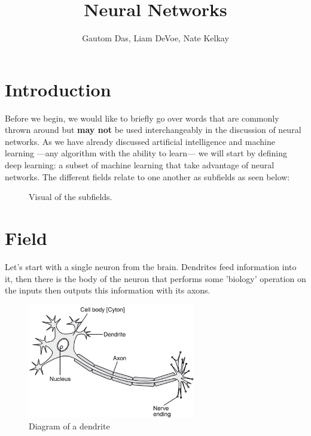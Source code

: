 \documentclass[12pt]{article}
\title{Neural Networks\vspace{-3ex}}
\author{Gautom Das, Liam DeVoe, Nate Kelkay}
\date{}
\begin{document}
\maketitle
\vspace{-12ex}
\section*{Introduction}
\vspace{-3ex}
Before we begin, we would like to briefly go over words that are commonly thrown around but \textbf{may not} be used interchangeably in the discussion of neural networks. As we have already discussed artificial intelligence and  machine learning —any algorithm with the ability to learn— we will start by defining deep learning: a subset of machine learning that take advantage of neural networks. The different fields relate to one another as subfields as seen below:

\begin{figure}[h]
	\centering
	\caption{Visual of the subfields.}
	\label{fig:vis}
\end{figure}

\section*{Field}
Let's start with a single neuron from the brain. Dendrites feed information into it, then there is the body of the neuron that performs some 'biology' operation on the inputs then outputs this information with its axons.

\begin{figure}[h]
\center
\includegraphics[width=0.65\textwidth]{12img}
	\caption{Diagram of a dendrite}
	\label{fig:vis}
\end{figure}
\end{document}
